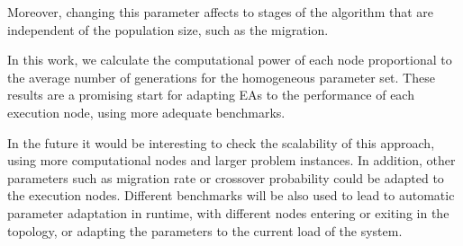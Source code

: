 \documentclass[final,1p,times]{elsarticle}
\begin{document}

Moreover, changing this parameter affects to stages
of the algorithm that are independent of the population size, such as
the migration. 

In this work, we calculate the computational power of each node proportional 
to the average number of generations for the homogeneous parameter set. These results are a promising start for adapting EAs to the
performance of each execution node, using more adequate benchmarks. 

In the future it would be interesting to check the scalability of this
approach, using more computational nodes and larger problem
instances. In addition, other parameters such as migration rate or
crossover probability could be adapted to the execution
nodes. Different benchmarks will be also used to lead to automatic
parameter adaptation in runtime, with different nodes entering or
exiting in the topology, or adapting the parameters to the current load of the
system. 





%
%









\end{document}
